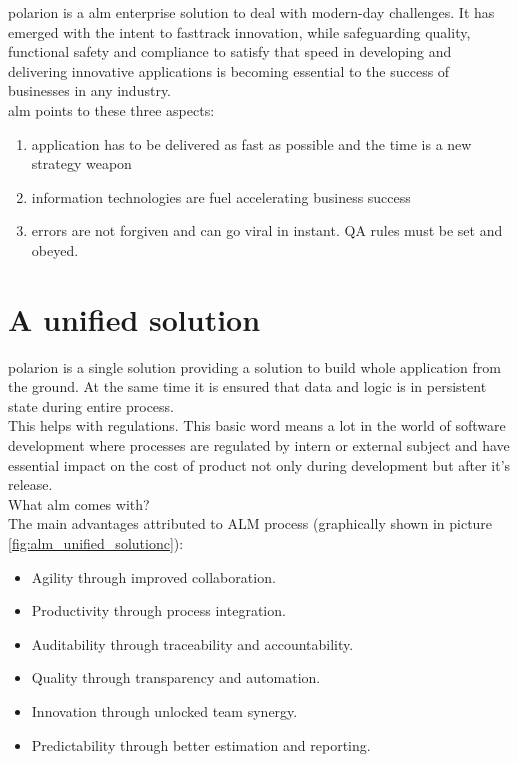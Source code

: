 \documentclass[thesis=M,english]{FITthesis}[2012/06/26]
\begin{document}
\acrshort{polarion} is a \acrshort{alm} enterprise solution to deal with modern-day challenges. It has emerged with the intent to fasttrack
innovation, while safeguarding quality, functional safety and compliance to satisfy that speed in developing and delivering innovative applications is becoming essential to the success of businesses in any industry.\\

\pagebreak
\acrshort{alm} points to these three aspects:
\begin{enumerate}[nosep]
	\item application has to be delivered as fast as possible and the time is a new strategy weapon 
	\item information technologies are fuel accelerating business success
	\item errors are not forgiven and can go viral in instant. QA rules must be set and obeyed.
\end{enumerate}

\section{A unified solution}

\acrshort{polarion} is a single solution providing a solution to build whole application from the ground. At the same time it is ensured that data and logic is in persistent state during entire process.\\ 

This helps with regulations. This basic word means a lot in the world of software development where processes are regulated by intern or external subject and have essential impact on the cost of product not only during development but after it's release.\\

What \acrshort{alm} comes with?\\

The main advantages attributed to ALM process (graphically shown in picture \ref{fig:alm_unified_solutionc}):
\begin{itemize}[nosep]
\item Agility through improved collaboration.
\item Productivity through process integration.
\item Auditability through traceability and accountability.
\item Quality through transparency and automation.
\item Innovation through unlocked team synergy.
\item Predictability through better estimation and reporting.\\
\end{itemize}
\end{document}
